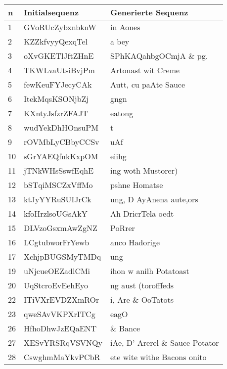 \begin{center}
    \begin{table}
        \centering
        \begin{tabular}{ |l|l|l| }

            \hline
            \textbf{n} & \textbf{Initialsequenz} & \textbf{Generierte Sequenz} \\
            \hline
            1 & GVoRUcZybxnbknW & in Aones \\
            2 & KZZkfvyyQexqTel & a bey \\
            3 & oXvGKETlJftZHnE & SPhKAQahbgOCmjA \& pg. \\
            4 & TKWLvaUtsiBvjPm & Artonast wit Creme \\
            5 & fewKeuFYJecyCAk & Autt, cu paAte Sauce \\
            6 & ItekMqsKSONjbZj & gngn \\
            7 & KXntyJsfzrZFAJT & eatong \\
            8 & wudYekDhHOnsuPM & t \\
            9 & rOVMbLyCBbyCCSv & uAf \\
            10 & sGrYAEQfnkKxpOM & eiihg \\
            11 & jTNkWHsSswfEqhE & ing woth Mustorer) \\
            12 & bSTqiMSCZxVffMo & pshne Homatse \\
            13 & ktJyYYRuSUIJrCk & ung, D AyAnena aute,ors \\
            14 & kfoHrzlsoUGsAkY & Ah DricrTela oedt \\
            15 & DLVzoGsxmAwZgNZ & PoRrer \\
            16 & LCgtubworFrYewb & anco Hadorige \\
            17 & XchjpBUGSMyTMDq & ung \\
            19 & uNjcueOEZadlCMi & ihon w anilh Potatoast \\
            20 & UqStcroEvEehEyo & ng aust (torofffeds \\
            22 & ITiVXrEVDZXmROr & i, Are \& OoTatots \\
            23 & qweSAvVKPXrITCg & eagO \\
            26 & HfhoDhwJzEQaENT & \& Bance \\
            27 & XESvYRSRqVSVNQy & iAe, D' Arerel \& Sauce Potator \\
            28 & CswghmMaYkvPCbR & ete wite withe Bacons onito \\

\end{tabular}
\end{table}
\end{center}
